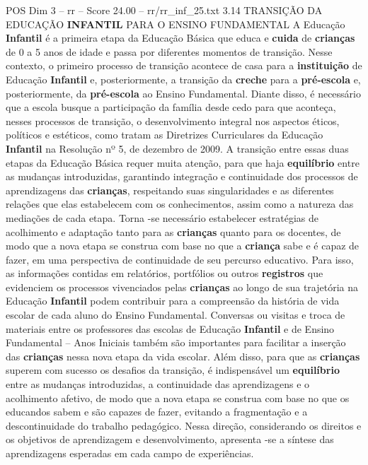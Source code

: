 \begin{textsample}{POS Dim 3 – rr – Score 24.00 – rr/rr\_inf\_25.txt}  \label{ex:f3_pos_221}
3.14 TRANSIÇÃO DA EDUCAÇÃO \textbf{INFANTIL} PARA O ENSINO FUNDAMENTAL A Educação \textbf{Infantil} é a primeira etapa da Educação Básica que educa e \textbf{cuida} de \textbf{crianças} de 0 a 5 anos de idade e passa por diferentes momentos de transição.
Nesse contexto, o primeiro processo de transição acontece de casa para a \textbf{instituição} de Educação \textbf{Infantil} e, posteriormente, a transição da \textbf{creche} para a \textbf{pré-escola} e, posteriormente, da \textbf{pré-escola} ao Ensino Fundamental.
Diante disso, é necessário que a escola busque a participação da família desde cedo para que aconteça, nesses processos de transição, o desenvolvimento integral nos aspectos éticos, políticos e estéticos, como tratam as Diretrizes Curriculares da Educação \textbf{Infantil} na Resolução nº 5, de dezembro de 2009.
A transição entre essas duas etapas da Educação Básica requer muita atenção, para que haja \textbf{equilíbrio} entre as mudanças introduzidas, garantindo integração e continuidade dos processos de aprendizagens das \textbf{crianças}, respeitando suas singularidades e as diferentes relações que elas estabelecem com os conhecimentos, assim como a natureza das mediações de cada etapa.
Torna -se necessário estabelecer estratégias de acolhimento e adaptação tanto para as \textbf{crianças} quanto para os docentes, de modo que a nova etapa se construa com base no que a \textbf{criança} sabe e é capaz de fazer, em uma perspectiva de continuidade de seu percurso educativo.
Para isso, as informações contidas em relatórios, portfólios ou outros \textbf{registros} que evidenciem os processos vivenciados pelas \textbf{crianças} ao longo de sua trajetória na Educação \textbf{Infantil} podem contribuir para a compreensão da história de vida escolar de cada aluno do Ensino Fundamental.
Conversas ou visitas e troca de materiais entre os professores das escolas de Educação \textbf{Infantil} e de Ensino Fundamental – Anos Iniciais também são importantes para facilitar a inserção das \textbf{crianças} nessa nova etapa da vida escolar.
Além disso, para que as \textbf{crianças} superem com sucesso os desafios da transição, é indispensável um \textbf{equilíbrio} entre as mudanças introduzidas, a continuidade das aprendizagens e o acolhimento afetivo, de modo que a nova etapa se construa com base no que os educandos sabem e são capazes de fazer, evitando a fragmentação e a descontinuidade do trabalho pedagógico.
Nessa direção, considerando os direitos e os objetivos de aprendizagem e desenvolvimento, apresenta -se a síntese das aprendizagens esperadas em cada campo de experiências.

\end{textsample}
